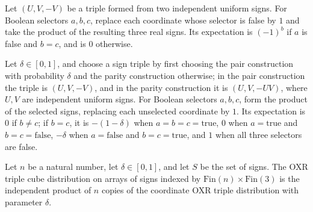 \begin{theorem}
\label{FABL.pmfExpectation_oxrPairTriplePMF_selectedSign}
\leanok
{}
Let $(U,V,-V)$ be a triple formed from two independent uniform signs. For Boolean
selectors $a,b,c$, replace each coordinate whose selector is false by $1$ and take the
product of the resulting three real signs. Its expectation is $(-1)^b$ if $a$ is false
and $b=c$, and is $0$ otherwise.
\end{theorem}

\begin{theorem}
\label{FABL.pmfExpectation_oxrCoordinateTriplePMF_selectedSign}
\leanok
{}
Let $\delta\in[0,1]$, and choose a sign triple by first choosing the pair construction
with probability $\delta$ and the parity construction otherwise; in the pair
construction the triple is $(U,V,-V)$, and in the parity construction it is $(U,V,-UV)$,
where $U,V$ are independent uniform signs. For Boolean selectors $a,b,c$, form the
product of the selected signs, replacing each unselected coordinate by $1$. Its
expectation is $0$ if $b\ne c$; if $b=c$, it is $-(1-\delta)$ when
$a=b=c=\mathrm{true}$, $0$ when $a=\mathrm{true}$ and $b=c=\mathrm{false}$, $-\delta$
when $a=\mathrm{false}$ and $b=c=\mathrm{true}$, and $1$ when all three selectors are
false.
\end{theorem}

\begin{definition}
\label{FABL.oxrTripleCubePMF}
\leanok
{}
Let $n$ be a natural number, let $\delta\in[0,1]$, and let $S$ be the set of signs. The
OXR triple cube distribution on arrays of signs indexed by
$\mathrm{Fin}(n)\times\mathrm{Fin}(3)$ is the independent product of $n$ copies of the
coordinate OXR triple distribution with parameter $\delta$.
\end{definition}

